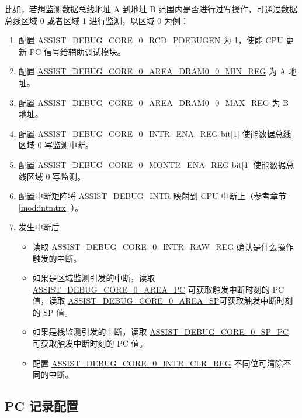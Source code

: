 \documentclass[main\_\_CN.tex]{subfiles}
\begin{document}
 比如，若想监测数据总线地址 A 到地址 B 范围内是否进行过写操作，可通过数据总线区域 0 或者区域 1 进行监测，以区域 0 为例：
\begin{enumerate}
    \item 配置 \hyperref[fielddesc:ASSISTDEBUGCORE0RCDPDEBUGEN]{ASSIST\_DEBUG\_CORE\_0\_RCD\_PDEBUGEN} 为 1，使能 CPU 更新 PC 信号给辅助调试模块。
    \item 配置 \hyperref[regdesc:ASSISTDEBUGCORE0AREADRAM00MINREG]{ASSIST\_DEBUG\_CORE\_0\_AREA\_DRAM0\_0\_MIN\_REG} 为 A 地址。
    \item 配置 \hyperref[regdesc:ASSISTDEBUGCORE0AREADRAM00MAXREG]{ASSIST\_DEBUG\_CORE\_0\_AREA\_DRAM0\_0\_MAX\_REG} 为 B 地址。
    \item 配置 \hyperref[regdesc:ASSISTDEBUGCORE0INTRENAREG]{ASSIST\_DEBUG\_CORE\_0\_INTR\_ENA\_REG} bit[1] 使能数据总线区域 0 写监测中断。
    \item 配置 \hyperref[regdesc:ASSISTDEBUGCORE0MONTRENAREG]{ASSIST\_DEBUG\_CORE\_0\_MONTR\_ENA\_REG} bit[1] 使能数据总线区域 0 写监测。
    \item 配置中断矩阵将 ASSIST\_DEBUG\_INTR 映射到 CPU 中断上（参考章节 \ref{mod:intmtrx} \textit{}）。
    \item 发生中断后
    \begin{itemize}
        \item 读取 \hyperref[regdesc:ASSISTDEBUGCORE0INTRRAWREG]{ASSIST\_DEBUG\_CORE\_0\_INTR\_RAW\_REG} 确认是什么操作触发的中断。
        \item 如果是区域监测引发的中断，读取 \hyperref[fielddesc:ASSISTDEBUGCORE0AREAPC]{ASSIST\_DEBUG\_CORE\_0\_AREA\_PC} 可获取触发中断时刻的 PC 值，读取 \hyperref[fielddesc:ASSISTDEBUGCORE0AREASP]{ASSIST\_DEBUG\_CORE\_0\_AREA\_SP}可获取触发中断时刻的 SP 值。
        \item 如果是栈监测引发的中断，读取 \hyperref[fielddesc:ASSISTDEBUGCORE0SPPC]{ASSIST\_DEBUG\_CORE\_0\_SP\_PC} 可获取触发中断时刻的 PC 值。
        \item 配置 \hyperref[regdesc:ASSISTDEBUGCORE0INTRCLRREG]{ASSIST\_DEBUG\_CORE\_0\_INTR\_CLR\_REG} 不同位可清除不同的中断。
    \end{itemize}

\end{enumerate}


\subsection{PC 记录配置}
\end{document}
